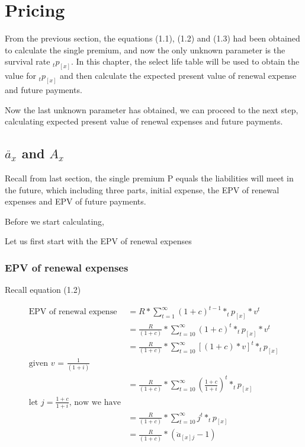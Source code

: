 \documentclass{report}
\begin{document}
\section{Pricing}

From the previous section, the equations (1.1), (1.2) and (1.3) had been obtained to calculate the single premium, and now the only unknown parameter is the survival rate $_tp_{[x]}$. In this chapter, the select life table will be used to obtain the value for $_tp_{[x]}$ and then calculate the expected present value of renewal expense and future payments. 



Now the last unknown parameter has obtained, we can proceed to the next step, calculating expected present value of renewal expenses and future payments.



\subsection{$\ddot{a_x}$ and $A_x$}

Recall from last section, the single premium P equals the liabilities will meet in the future, which including three parts, initial expense, the EPV of renewal expenses and EPV of future payments.


Before we start calculating, 


Let us first start with the EPV of renewal expenses
\subsubsection{EPV of renewal expenses}

Recall equation (1.2)

\begin{align}
        \text{EPV of renewal expense}&= R  * \sum_{t=1}^{\infty}(1 + c )^{t-1} * _tp_{[x]}* v^t\\
        &= \frac{R}{(1+c)} * \sum_{t=10}^{\infty} (1 + c )^t * _tp_{[x]} * v^t\\
        &= \frac{R}{(1+c)} * \sum_{t=10}^{\infty} [(1 + c )*v]^t * _tp_{[x]} \\
\text{given $v$ = $\frac{1}{(1+i)} $}\\
        &= \frac{R}{(1+c)} * \sum_{t=10}^{\infty} \left(\frac{1+c}{1+i}\right)^t * _tp_{[x]} \\
\text{let $j = \frac{1+c}{1+i}$, now we have}\\
        &= \frac{R}{(1+c)} * \sum_{t=10}^{\infty} j^t * _tp_{[x]}\\
        &= \frac{R}{(1+c)} * (\ddot{a}_{[x]j}-1)
\end{align}
\end{document}
